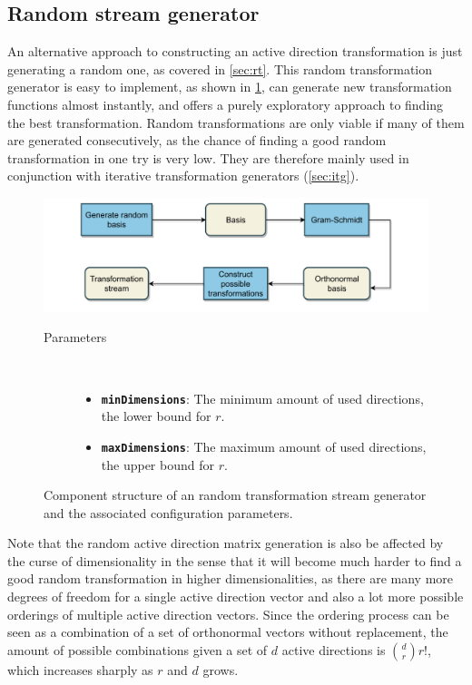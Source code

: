 \documentclass[
  a4paper,  %
  twoside,  %
  bibliography=totoc,
  headsepline,
  cleardoublepage=empty,
  parskip=half,
  draft=false
]{scrbook}
\begin{document}
\subsection {Random stream generator}
\label{sec:rtg}

An alternative approach to constructing an active direction transformation is just generating a random one, as covered in \cref{sec:rt}.
This random transformation generator is easy to implement, as shown in \cref{fig:rtsg}, can generate new transformation functions almost instantly, and offers a purely exploratory approach to finding the best transformation.
Random transformations are only viable if many of them are generated consecutively, as the chance of finding a good random transformation in one try is very low.
They are therefore mainly used in conjunction with iterative transformation generators (\cref{sec:itg}).

\begin{mdframed}[style=style,frametitle={Transformation stream generator (random)}]
\begin{figure}[H]
\includegraphics[width=\textwidth]{graphics/TransformationStreamGen_Random.pdf}
\delimit
\begin{description}
\item[Parameters] {~ \begin{itemize}[\indent{}]
\item \texttt{\textbf{minDimensions}}: The minimum amount of used directions, \ie the lower bound for $r$.
\item \texttt{\textbf{maxDimensions}}: The maximum amount of used directions, \ie the upper bound for $r$.
\end{itemize}}
\end{description}
\delimit
\caption{Component structure of an random transformation stream generator and the associated configuration parameters.}
\label{fig:rtsg}
\end{figure}
\end{mdframed}
%
Note that the random active direction matrix generation is also be affected by the curse of dimensionality in the sense that it will become much harder to find a good random transformation in higher dimensionalities, as there are many more degrees of freedom for a single active direction vector and also a lot more possible orderings of multiple active direction vectors.
Since the ordering process can be seen as a combination of a set of orthonormal vectors without replacement, the amount of possible combinations given a set of $d$ active directions is $\binom{d}{r} r!$, which increases sharply as $r$ and $d$ grows.
\end{document}
